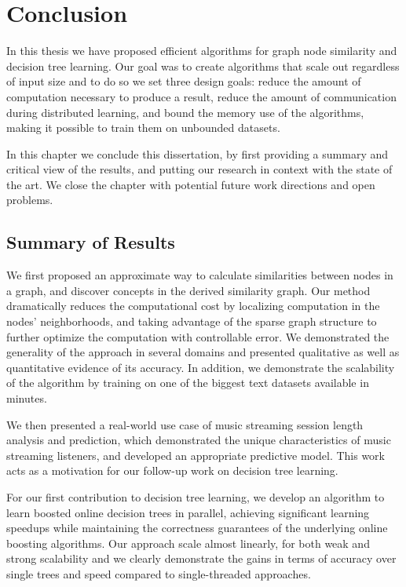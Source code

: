 \chapter{Conclusion}

In this thesis we have proposed efficient algorithms for graph node
similarity and decision tree learning. Our goal was to create
algorithms that scale out regardless of input size and to do so
we set three design goals: reduce the amount of computation
necessary to produce a result, reduce the amount of communication
during distributed learning, and bound the memory use of the algorithms,
making it possible to train them on unbounded datasets.

In this chapter we conclude this dissertation, by first providing a
summary and critical view of the results, and putting our research
in context with the state of the art.
We close the chapter with potential future work directions and open
problems.

\section{Summary of Results}
We first proposed an approximate way to calculate similarities between
nodes in a graph, and discover concepts in the derived similarity
graph. Our method dramatically reduces the computational cost
by localizing computation in the nodes' neighborhoods, and taking advantage
of the sparse graph structure to further optimize the computation with controllable
error. We demonstrated the generality of the approach in several domains and presented
qualitative as well as quantitative evidence of its accuracy. In addition, we demonstrate
the scalability of the algorithm by training on one of the biggest text datasets
available in minutes.

We then presented a real-world use case of music streaming session length analysis and prediction,
which demonstrated the unique characteristics of music streaming listeners, and developed
an appropriate predictive model. This work acts as a motivation for our follow-up work
on decision tree learning.

For our first contribution to decision tree learning, we develop an algorithm
to learn boosted online decision trees in parallel, achieving significant
learning speedups while maintaining the correctness guarantees of the
underlying online boosting algorithms. Our approach scale almost linearly,
for both weak and strong scalability and we clearly demonstrate the gains
in terms of accuracy over single trees and speed compared to single-threaded
approaches.


